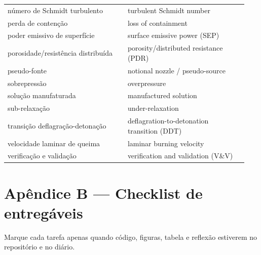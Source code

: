 \documentclass[10pt,a4paper,twocolumn,openany]{report}
\begin{document}
\begin{center}
\begin{tabular}{@{}p{0.47\linewidth}p{0.47\linewidth}@{}}
número de Schmidt turbulento & turbulent Schmidt number\\
perda de contenção & loss of containment\\
poder emissivo de superfície & surface emissive power (SEP)\\
porosidade/resistência distribuída & porosity/distributed resistance (PDR)\\
pseudo-fonte & notional nozzle / pseudo-source\\
sobrepressão & overpressure\\
solução manufaturada & manufactured solution\\
sub-relaxação & under-relaxation\\
transição deflagração-detonação & deflagration-to-detonation transition (DDT)\\
velocidade laminar de queima & laminar burning velocity\\
verificação e validação & verification and validation (V\&V)\\
\bottomrule
\end{tabular}
\end{center}

\chapter*{Apêndice B --- Checklist de entregáveis}

Marque cada tarefa apenas quando código, figuras, tabela e reflexão
estiverem no repositório e no diário.
\end{document}
